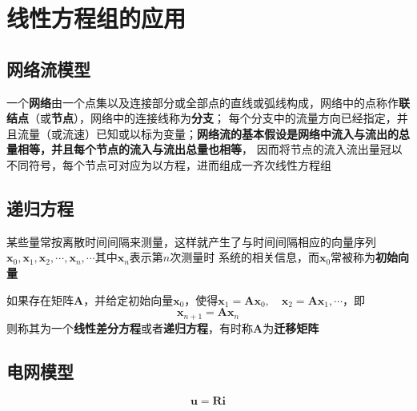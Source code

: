 \documentclass[UTF8]{ctexart}
\newcommand{\ve}[1]{{\bm{#1}}}
\newcommand{\mat}[1]{\ve{#1}}
\begin{document}
\section*{线性方程组的应用}
\subsection*{网络流模型}
一个\textbf{网络}由一个点集以及连接部分或全部点的直线或弧线构成，网络中的点称作\textbf{联结点}（或\textbf{节点}），网络中的连接线称为\textbf{分支}；
每个分支中的流量方向已经指定，并且流量（或流速）已知或以标为变量；\textbf{网络流的基本假设是网络中流入与流出的总量相等，并且每个节点的流入与流出总量也相等}，
因而将节点的流入流出量冠以不同符号，每个节点可对应为以方程，进而组成一齐次线性方程组
\subsection*{递归方程}
某些量常按离散时间间隔来测量，这样就产生了与时间间隔相应的向量序列$\mat{x}_0,\mat{x}_1,\mat{x}_2,\cdots,\mat{x}_n,\cdots$其中$\mat{x}_n$表示第$n$次测量时
系统的相关信息，而$\mat{x}_0$常被称为\textbf{初始向量}

如果存在矩阵$\mat{A}$，并给定初始向量$\mat{x}_0$，使得$\mat{x}_1=\mat{A}\mat{x}_0,\quad\mat{x}_2=\mat{A}\mat{x}_1,\cdots$，即
\[\mat{x}_{n+1}=\mat{A}\mat{x}_n\]
则称其为一个\textbf{线性差分方程}或者\textbf{递归方程}，有时称$\mat{A}$为\textbf{迁移矩阵}
\subsection*{电网模型}
\[\mat{u}=\mat{R}\mat{i}\]
\end{document}
